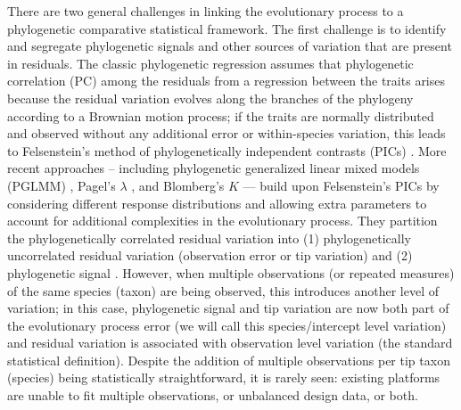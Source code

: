 There are two general challenges in linking the evolutionary process to a phylogenetic comparative statistical framework.
The first challenge is to identify and segregate phylogenetic signals \citep{blomberg2003testing} and other sources of variation that are present in residuals.  
The classic phylogenetic regression assumes that phylogenetic correlation (PC) among the residuals from a regression between the traits arises because the residual variation evolves along the branches of the phylogeny according to a Brownian motion process; if the traits are normally distributed and observed without any additional error or within-species variation, this leads to Felsenstein's method of phylogenetically independent contrasts (PICs) \citep{felsenstein1985phylogenies}.
More recent approaches -- including phylogenetic generalized linear mixed models (PGLMM) \citep{ives2011generalized}, Pagel's $\lambda$ \citep{pagel1999inferring}, and Blomberg's $K$ \citep{blomberg2003testing} --- build upon Felsenstein's PICs by considering different response distributions and allowing extra parameters to account for additional complexities in the evolutionary process. They partition the phylogenetically correlated residual variation into (1) phylogenetically uncorrelated residual variation (observation error or tip variation) and (2) phylogenetic signal  \citep[biological/evolutionary process error:][]{hansen2012interpreting}.
However, when multiple observations (or repeated measures) of the same species (taxon) are being observed, this introduces another level of variation; in this case, phylogenetic signal and tip variation are now both part of the evolutionary process error (we will call this species/intercept level variation) and residual variation is associated with observation level variation (the standard statistical definition).
Despite the addition of multiple observations per tip taxon (species) being statistically straightforward, it is rarely seen: existing platforms are unable to fit multiple observations, or unbalanced design data, or both.


